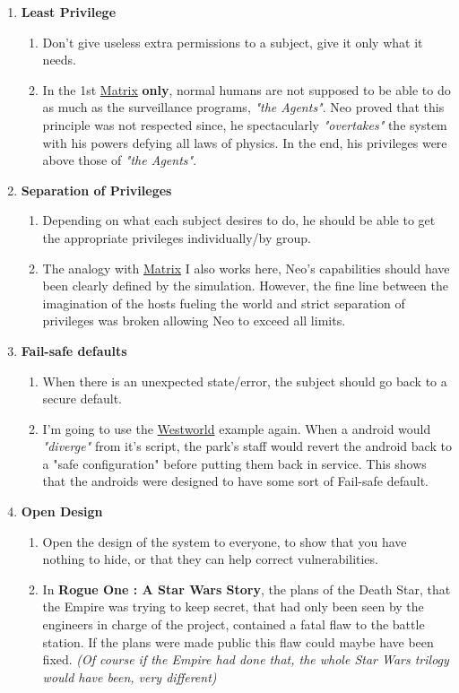 \documentclass[12pt]{article}
\begin{document}
\begin{enumerate}
\begin{enumerate}
\begin{enumerate}
				\end{enumerate}
			\item \textbf{Least Privilege}
				\begin{enumerate}
					\item Don't give useless extra permissions to a subject, give it only what it needs.
					\item In the 1st \underline{Matrix} \textbf{only}, normal humans are not supposed to be able to do as much as the surveillance programs, \textit{"the Agents"}. Neo proved that this principle was not respected since, he spectacularly \textit{"overtakes"} the system with his powers defying all laws of physics. In the end, his privileges were above those of \textit{"the Agents"}.
				\end{enumerate}
			\item \textbf{Separation of Privileges}
				\begin{enumerate}
					\item Depending on what each subject desires to do, he should be able to get the appropriate privileges individually/by group.
					\item The analogy with \underline{Matrix} I also works here, Neo's capabilities should have been clearly defined by the simulation. However, the fine line between the imagination of the hosts fueling the world and strict separation of privileges was broken allowing Neo to exceed all limits.
				\end{enumerate}
			\item \textbf{Fail-safe defaults}
				\begin{enumerate}
					\item When there is an unexpected state/error, the subject should go back to a secure default.
					\item I'm going to use the \underline{Westworld} example again. When a android would \textit{"diverge"} from it's script, the park's staff would revert the android back to a "safe configuration" before putting them back in service. This shows that the androids were designed to have some sort of Fail-safe default.
				\end{enumerate}
			\item \textbf{Open Design}
				\begin{enumerate}
					\item Open the design of the system to everyone, to show that you have nothing to hide, or that they can help correct vulnerabilities.
					\item In \textbf{Rogue One : A Star Wars Story}, the plans of the Death Star, that the Empire was trying to keep secret, that had only been seen by the engineers in charge of the project, contained a fatal flaw to the battle station. If the plans were made public this flaw could maybe have been fixed. \textit{(Of course if the Empire had done that, the whole Star Wars trilogy would have been, very different)}
				\end{enumerate}
		\end{enumerate}		
\end{enumerate}
\end{document}
